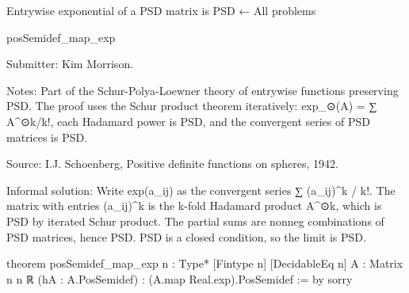 Entrywise exponential of a PSD matrix is PSD
← All problems

posSemidef_map_exp

Submitter: Kim Morrison.

Notes: Part of the Schur-Polya-Loewner theory of entrywise functions preserving PSD. The proof uses the Schur product theorem iteratively: exp_⊙(A) = ∑ A^{⊙k}/k!, each Hadamard power is PSD, and the convergent series of PSD matrices is PSD.

Source: I.J. Schoenberg, Positive definite functions on spheres, 1942.

Informal solution: Write exp(a_{ij}) as the convergent series ∑ (a_{ij})^k / k!. The matrix with entries (a_{ij})^k is the k-fold Hadamard product A^{⊙k}, which is PSD by iterated Schur product. The partial sums are nonneg combinations of PSD matrices, hence PSD. PSD is a closed condition, so the limit is PSD.

theorem posSemidef_map_exp {n : Type*} [Fintype n] [DecidableEq n]
    {A : Matrix n n ℝ} (hA : A.PosSemidef) :
    (A.map Real.exp).PosSemidef := by
  sorry
